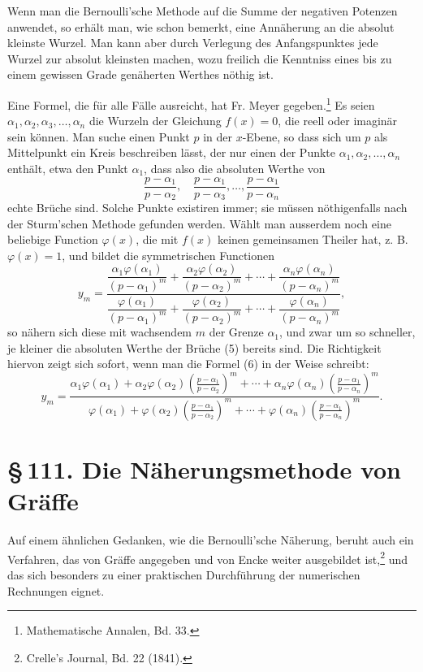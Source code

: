 \documentclass[11pt]{article}
\providecommand{\sect}[2]{\section*{\S\,#1. #2}}
\begin{document}
Wenn man die Bernoulli'sche Methode auf die Summe der negativen Potenzen anwendet, so erhält man, wie schon bemerkt, eine Annäherung an die absolut kleinste Wurzel. Man kann aber durch Verlegung des Anfangspunktes jede Wurzel zur absolut kleinsten machen, wozu freilich die Kenntniss eines bis zu einem gewissen Grade genäherten Werthes nöthig ist.

Eine Formel, die für alle Fälle ausreicht, hat Fr. Meyer gegeben.\footnote{Mathematische Annalen, Bd. 33.} Es seien $\alpha_1,\alpha_2,\alpha_3,\ldots,\alpha_n$ die Wurzeln der Gleichung $f(x)=0$, die reell oder imaginär sein können. Man suche einen Punkt $p$ in der $x$-Ebene, so dass sich um $p$ als Mittelpunkt ein Kreis beschreiben lässt, der nur einen der Punkte $\alpha_1,\alpha_2,\ldots,\alpha_n$ enthält, etwa den Punkt $\alpha_1$, dass also die absoluten Werthe von
\begin{equation}
        \frac{p-\alpha_1}{p-\alpha_2},\quad
        \frac{p-\alpha_1}{p-\alpha_3},\ldots,
        \frac{p-\alpha_1}{p-\alpha_n}
\tag{5}
\end{equation}
echte Brüche sind. Solche Punkte existiren immer; sie müssen nöthigenfalls nach der Sturm'schen Methode gefunden werden. Wählt man ausserdem noch eine beliebige Function $\varphi(x)$, die mit $f(x)$ keinen gemeinsamen Theiler hat, z. B. $\varphi(x)=1$, und bildet die symmetrischen Functionen
\begin{equation}
y_m=
\frac{\dfrac{\alpha_1\varphi(\alpha_1)}{(p-\alpha_1)^m}
+\dfrac{\alpha_2\varphi(\alpha_2)}{(p-\alpha_2)^m}+\cdots+
\dfrac{\alpha_n\varphi(\alpha_n)}{(p-\alpha_n)^m}}
{\dfrac{\varphi(\alpha_1)}{(p-\alpha_1)^m}
+\dfrac{\varphi(\alpha_2)}{(p-\alpha_2)^m}+\cdots+
\dfrac{\varphi(\alpha_n)}{(p-\alpha_n)^m}},
\tag{6}
\end{equation}
so nähern sich diese mit wachsendem $m$ der Grenze $\alpha_1$, und zwar um so schneller, je kleiner die absoluten Werthe der Brüche (5) bereits sind. Die Richtigkeit hiervon zeigt sich sofort, wenn man die Formel (6) in der Weise schreibt:
\[
y_m=
\frac{\alpha_1\varphi(\alpha_1)+
\alpha_2\varphi(\alpha_2)\left(\frac{p-\alpha_1}{p-\alpha_2}\right)^m
+\cdots+
\alpha_n\varphi(\alpha_n)\left(\frac{p-\alpha_1}{p-\alpha_n}\right)^m}
{\varphi(\alpha_1)+
\varphi(\alpha_2)\left(\frac{p-\alpha_1}{p-\alpha_2}\right)^m
+\cdots+
\varphi(\alpha_n)\left(\frac{p-\alpha_1}{p-\alpha_n}\right)^m}.
\]

\sect{111}{Die Näherungsmethode von Gräffe}

Auf einem ähnlichen Gedanken, wie die Bernoulli'sche Näherung, beruht auch ein Verfahren, das von Gräffe angegeben und von Encke weiter ausgebildet ist,\footnote{Crelle's Journal, Bd. 22 (1841).} und das sich besonders zu einer praktischen Durchführung der numerischen Rechnungen eignet.
\end{document}
